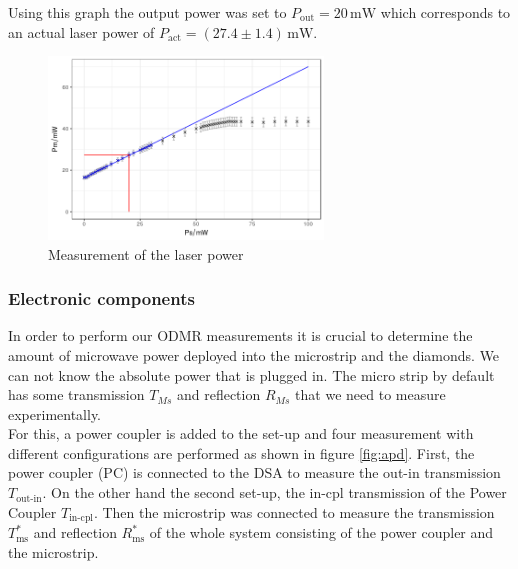 Using this graph the output power was set to $P_\text{out}=20\,\mathrm{mW}$ which corresponds to an actual laser power of $P_\text{act}=(27.4\pm1.4)\,\mathrm{mW}$.
\begin{figure}
	\centering
	\includegraphics[width=0.65\textwidth]{../figures/powercal.png}
	\caption{Measurement of the laser power}
	\label{fig:power}
\end{figure}


\subsubsection{Electronic components}


In order to perform our ODMR measurements it is crucial to determine the amount of microwave power deployed into the microstrip and the diamonds. We can not know the absolute power that is plugged in. The micro strip by default has some transmission $T_{Ms}$ and reflection $R_{Ms}$ that we need to measure experimentally.\\

For this, a power coupler is added to the set-up and four measurement with different configurations are performed as shown in figure \ref{fig:apd}. First, the power coupler (PC) is connected to the DSA to measure the out-in transmission $T_\text{out-in}$. On the other hand the second set-up, the in-cpl transmission of the Power Coupler $T_\text{in-cpl}$. Then the microstrip was connected to measure the transmission $T_\text{ms}^*$ and reflection $R_\text{ms}^*$ of the whole system consisting of the power coupler and the microstrip.


